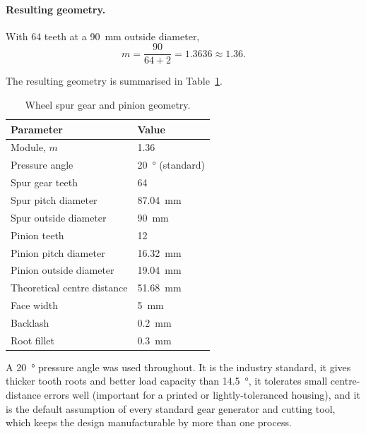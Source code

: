 \documentclass[12pt,a4paper]{article}
\begin{document}
\paragraph{Resulting geometry.}
With 64 teeth at a \SI{90}{\milli\metre} outside diameter,
\begin{equation}
	m = \frac{90}{64 + 2} = 1.3636 \approx 1.36 .
\end{equation}

The resulting geometry is summarised in Table~\ref{tab:spur-geom}.

\begin{table}[htbp]
	\centering
	\caption{Wheel spur gear and pinion geometry.}
	\label{tab:spur-geom}
	\begin{tabular}{ll}
		\toprule
		\textbf{Parameter} & \textbf{Value} \\
		\midrule
		Module, $m$                 & \num{1.36} \\
		Pressure angle              & \SI{20}{\degree} (standard) \\
		Spur gear teeth             & 64 \\
		Spur pitch diameter         & \SI{87.04}{\milli\metre} \\
		Spur outside diameter       & \SI{90}{\milli\metre} \\
		Pinion teeth                & 12 \\
		Pinion pitch diameter       & \SI{16.32}{\milli\metre} \\
		Pinion outside diameter     & \SI{19.04}{\milli\metre} \\
		Theoretical centre distance & \SI{51.68}{\milli\metre} \\
		Face width                  & \SI{5}{\milli\metre} \\
		Backlash                    & \SI{0.2}{\milli\metre} \\
		Root fillet                 & \SI{0.3}{\milli\metre} \\
		\bottomrule
	\end{tabular}
\end{table}

A \SI{20}{\degree} pressure angle was used throughout. It is the industry
standard, it gives thicker tooth roots and better load capacity than
\SI{14.5}{\degree}, it tolerates small centre-distance errors well (important
for a printed or lightly-toleranced housing), and it is the default assumption
of every standard gear generator and cutting tool, which keeps the design
manufacturable by more than one process.
\end{document}
